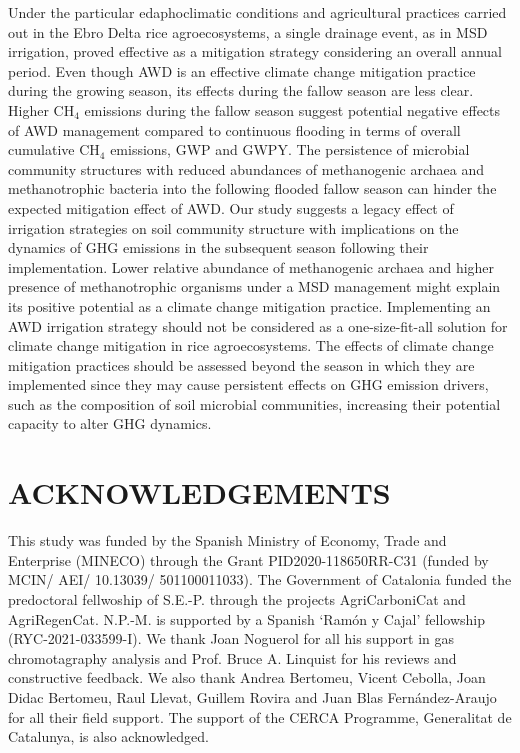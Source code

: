 Under the particular edaphoclimatic conditions and agricultural practices carried out in the Ebro Delta rice agroecosystems, 
a single drainage event, as in MSD irrigation, proved effective as a mitigation strategy considering an overall annual period. Even though AWD is an effective climate change mitigation practice during the growing season, its effects during the fallow season are less clear. Higher CH$_{4}$ emissions during the fallow season suggest potential negative effects of AWD management compared to continuous flooding in terms of overall cumulative CH$_{4}$ emissions, GWP and GWPY. %
The persistence of microbial community structures with reduced abundances of methanogenic archaea and methanotrophic bacteria into the following flooded fallow season can hinder the expected mitigation effect of AWD. Our study suggests a legacy effect of irrigation strategies on soil community structure with implications on the dynamics of GHG emissions in the subsequent season following their implementation. Lower relative abundance of methanogenic archaea and higher presence of methanotrophic organisms under a MSD management might explain its positive potential as a climate change mitigation practice. Implementing an AWD irrigation strategy should not be considered as a one-size-fit-all solution for climate change mitigation in rice agroecosystems. The effects of climate change mitigation practices should be assessed beyond the season in which they are implemented since they may cause persistent effects on GHG emission drivers, such as the composition of soil microbial communities, increasing their potential capacity to alter GHG dynamics.\\

\section*{ACKNOWLEDGEMENTS}
\label{sec:ackn}

This study was funded by the Spanish Ministry of Economy, Trade and Enterprise (MINECO) through the Grant PID2020-118650RR-C31 (funded by MCIN/ AEI/ 10.13039/ 501100011033). The Government of Catalonia funded the predoctoral fellwoship of S.E.-P. through the projects AgriCarboniCat and AgriRegenCat. N.P.-M. is supported by a Spanish ‘Ramón y Cajal’ fellowship (RYC-2021-033599-I). We thank Joan Noguerol for all his support in gas chromotagraphy analysis and Prof. Bruce A. Linquist for his reviews and constructive feedback. We also thank Andrea Bertomeu, Vicent Cebolla, Joan Didac Bertomeu, Raul Llevat, Guillem Rovira and Juan Blas Fernández-Araujo for all their field support. The support of the CERCA Programme, Generalitat de Catalunya, is also acknowledged.

